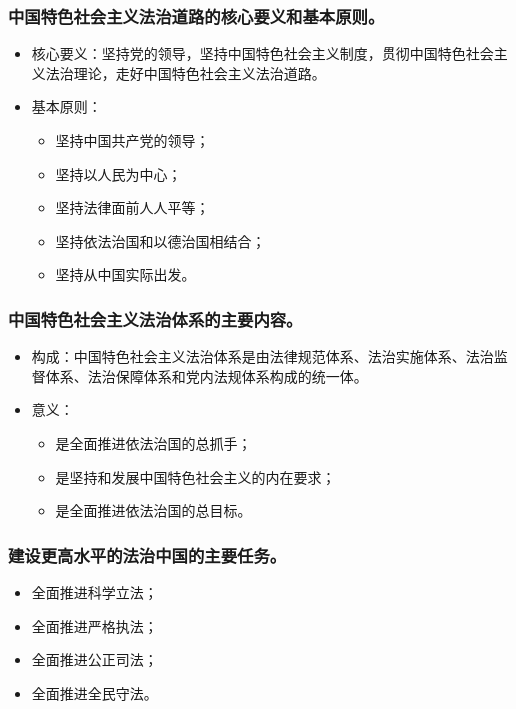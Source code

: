 \documentclass{article}
\begin{document}
\subsubsection{中国特色社会主义法治道路的核心要义和基本原则。}
\begin{itemize}
    \item 核心要义：坚持党的领导，坚持中国特色社会主义制度，贯彻中国特色社会主义法治理论，走好中国特色社会主义法治道路。
    \item 基本原则：
    \begin{itemize}
        \item 坚持中国共产党的领导；
        \item 坚持以人民为中心；
        \item 坚持法律面前人人平等；
        \item 坚持依法治国和以德治国相结合；
        \item 坚持从中国实际出发。
    \end{itemize}
\end{itemize}

\subsubsection{中国特色社会主义法治体系的主要内容。} 
\begin{itemize}
    \item 构成：中国特色社会主义法治体系是由法律规范体系、法治实施体系、法治监督体系、法治保障体系和党内法规体系构成的统一体。
    \item 意义：
    \begin{itemize}
        \item 是全面推进依法治国的总抓手；
        \item 是坚持和发展中国特色社会主义的内在要求；
        \item 是全面推进依法治国的总目标。
    \end{itemize}
\end{itemize}

\subsubsection{建设更高水平的法治中国的主要任务。}
\begin{itemize}
    \item 全面推进科学立法；
    \item 全面推进严格执法；
    \item 全面推进公正司法；
    \item 全面推进全民守法。
\end{itemize}
\end{document}
